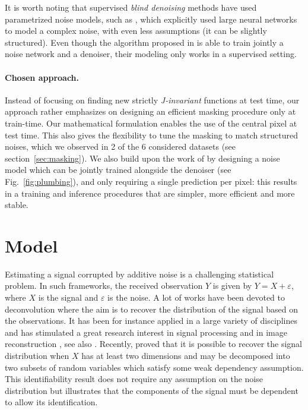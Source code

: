 \documentclass{article}
\begin{document}
It is worth noting that supervised \textit{blind denoising} methods have used parametrized noise models, such as \cite{zhang2017beyond,yue2019variational}, which explicitly used large neural networks to model a complex noise, with even less assumptions (it can be slightly structured). Even though the algorithm proposed in \cite{yue2019variational} is able to train jointly a noise network and a denoiser, their modeling only works in a supervised setting.

\paragraph{Chosen approach.} Instead of focusing on finding new strictly \textit{J-invariant} functions at test time, our approach rather emphasizes on designing an efficient masking procedure only at train-time. Our mathematical formulation enables the use of the central pixel at test time.
This also gives the flexibility to tune the masking to match structured noises, which we observed in 2 of the 6 considered datasets (see section~\ref{sec:masking}).
We also build upon the work of \cite{laine2019high, krull2019probabilistic} by designing a noise model which can be jointly trained alongside the denoiser (see Fig.~\ref{fig:plumbing}), and only requiring a single prediction per pixel: this results in a training and inference procedures that are simpler, more efficient and more stable.

\section{Model}
\label{sec:model}

Estimating a signal corrupted by additive noise  is a challenging statistical problem. In such frameworks, the received observation $Y$ is given by $Y = X + \varepsilon$,  where $X$ is the signal and $\varepsilon$ is the noise. A lot of works have been devoted to deconvolution where the aim is to recover the distribution of the signal based on the observations. It has been for instance applied in a large variety of disciplines and has stimulated a great research interest in signal processing \cite{moulines1997maximum,attias1998blind} and in image reconstruction \cite{kundur1996blind,campisi2017blind}, see also  \cite{meister:2009}. Recently, \cite{gassiat:lecorff:lehericy:2021} proved that it is possible to recover the signal distribution when $X$ has at least two dimensions and may be decomposed into two subsets of random variables which satisfy some weak dependency assumption. This identifiability result does not require any assumption on the noise distribution but illustrates that the components of the signal must be dependent to allow its identification. %
\end{document}
